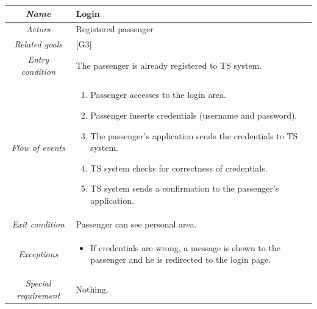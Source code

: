\begin{flushleft}
\begin{tabular}{c|>{\centering}p{10cm}}
\hline 
\emph{Name} & \raggedright{}Login\tabularnewline
\hline 
\emph{Actors} & \raggedright{}Registered passenger\tabularnewline
\hline 
\emph{Related goals} & \raggedright{}{[}G3{]}\tabularnewline
\hline 
\emph{Entry condition} & \raggedright{}The passenger is already registered to TS system.\tabularnewline
\hline 
\emph{Flow of events} & \begin{enumerate}
\item \begin{raggedright}
Passenger accesses to the login area.
\par\end{raggedright}
\item \begin{raggedright}
Passenger inserts credentials (username and password).
\par\end{raggedright}
\item \begin{raggedright}
The passenger's application sends the credentials to TS system.
\par\end{raggedright}
\item \begin{raggedright}
TS system checks for correctness of credentials.
\par\end{raggedright}
\item \raggedright{}TS system sends a confirmation to the passenger's application.\end{enumerate}
\tabularnewline
\hline 
\emph{Exit condition} & \raggedright{}Passenger can see personal area.\tabularnewline
\hline 
\emph{Exceptions} & \begin{itemize}
\item \raggedright{}If credentials are wrong, a message is shown to the
passenger and he is redirected to the login page.\end{itemize}
\tabularnewline
\hline 
\emph{Special requirement} & \raggedright{}Nothing.\tabularnewline
\hline 
\end{tabular}
\par\end{flushleft}

\clearpage{}

